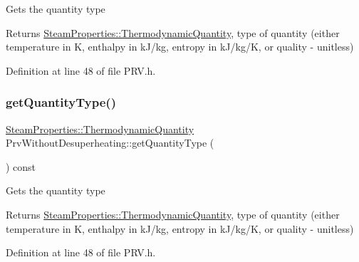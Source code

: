 Gets the quantity type

\begin{DoxyReturn}{Returns}
\hyperlink{class_steam_properties_ae0294bedf7d178c2d8fb6aed0f62fbff}{Steam\+Properties\+::\+Thermodynamic\+Quantity}, type of quantity (either temperature in K, enthalpy in k\+J/kg, entropy in k\+J/kg/K, or quality -\/ unitless) 
\end{DoxyReturn}


Definition at line 48 of file P\+R\+V.\+h.

\mbox{\label{class_prv_without_desuperheating_ad465c855f0c7271110ed2cb2ebccf081}} 
\subsubsection{\texorpdfstring{get\+Quantity\+Type()}{getQuantityType()}\hspace{0.1cm}{\footnotesize\ttfamily [2/3]}}
{\footnotesize\ttfamily \hyperlink{class_steam_properties_ae0294bedf7d178c2d8fb6aed0f62fbff}{Steam\+Properties\+::\+Thermodynamic\+Quantity} Prv\+Without\+Desuperheating\+::get\+Quantity\+Type (\begin{DoxyParamCaption}{ }\end{DoxyParamCaption}) const\hspace{0.3cm}{\ttfamily [inline]}}

Gets the quantity type

\begin{DoxyReturn}{Returns}
\hyperlink{class_steam_properties_ae0294bedf7d178c2d8fb6aed0f62fbff}{Steam\+Properties\+::\+Thermodynamic\+Quantity}, type of quantity (either temperature in K, enthalpy in k\+J/kg, entropy in k\+J/kg/K, or quality -\/ unitless) 
\end{DoxyReturn}


Definition at line 48 of file P\+R\+V.\+h.

\mbox{\label{class_prv_without_desuperheating_ad465c855f0c7271110ed2cb2ebccf081}} 
